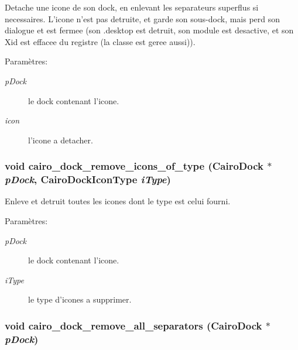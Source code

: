 Detache une icone de son dock, en enlevant les separateurs superflus si necessaires. L'icone n'est pas detruite, et garde son sous-dock, mais perd son dialogue et est fermee (son .desktop est detruit, son module est desactive, et son Xid est effacee du registre (la classe est geree aussi)). \begin{Desc}
\item[Paramètres:]
\begin{description}
\item[{\em pDock}]le dock contenant l'icone. \item[{\em icon}]l'icone a detacher. \end{description}
\end{Desc}
\subsubsection{\setlength{\rightskip}{0pt plus 5cm}void cairo\_\-dock\_\-remove\_\-icons\_\-of\_\-type ({\bf CairoDock} $\ast$ {\em pDock}, {\bf CairoDockIconType} {\em iType})}\label{cairo-dock-icons_8h_b27435756459370bf38b0edb0ac912e8}


Enleve et detruit toutes les icones dont le type est celui fourni. \begin{Desc}
\item[Paramètres:]
\begin{description}
\item[{\em pDock}]le dock contenant l'icone. \item[{\em iType}]le type d'icones a supprimer. \end{description}
\end{Desc}
\subsubsection{\setlength{\rightskip}{0pt plus 5cm}void cairo\_\-dock\_\-remove\_\-all\_\-separators ({\bf CairoDock} $\ast$ {\em pDock})}\label{cairo-dock-icons_8h_f2b6ce6d65ba32099af9d5321f751d3f}


